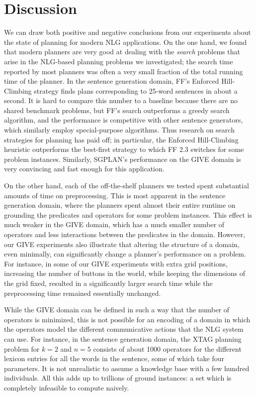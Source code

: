 \section{Discussion}
\label{sec:discussion}

We can draw both positive and negative conclusions from our experiments about
the state of planning for modern NLG applications. On the one hand, we found
that modern planners are very good at dealing with the \emph{search} problems
that arise in the NLG-based planning problems we investigated; the search
time reported by most planners was often a very small fraction of the total
running time of the planner. In the sentence generation domain, FF's Enforced
Hill-Climbing strategy finds plans corresponding to 25-word sentences in
about a second. It is hard to compare this number to a baseline because there
are no shared benchmark problems, but FF's search outperforms a greedy search
algorithm, and the performance is competitive with other sentence generators,
which similarly employ special-purpose algorithms. Thus research on search
strategies for planning has paid off; in particular, the Enforced
Hill-Climbing heuristic outperforms the best-first strategy to which FF 2.3
switches for some problem instances. Similarly, SGPLAN's performance on the
GIVE domain is very convincing and fast enough for this application.

On the other hand, each of the off-the-shelf planners we tested spent
substantial amounts of time on preprocessing. This is most apparent in the
sentence generation domain, where the planners spent almost their entire
runtime on grounding the predicates and operators for some problem instances.
This effect is much weaker in the GIVE domain, which has a much smaller
number of operators and less interactions between the predicates in the
domain. However, our GIVE experiments also illustrate that altering the
structure of a domain, even minimally, can significantly change a planner's
performance on a problem. For instance, in some of our GIVE experiments with
extra grid positions, increasing the number of buttons in the world, while
keeping the dimensions of the grid fixed, resulted in a significantly larger
search time while the preprocessing time remained essentially unchanged.

While the GIVE domain can be defined in such a way that the number of
operators is minimized, this is not possible for an encoding of a domain in
which the operators model the different communicative actions that the NLG
system can use. For instance, in the sentence generation domain, the XTAG
planning problem for $k=2$ and $n=5$ consists of about 1000 operators for the
different lexicon entries for all the words in the sentence, some of which
take four parameters. It is not unrealistic to assume a knowledge base with a
few hundred individuals. All this adds up to trillions of ground
instances: a set which is completely infeasible to compute naively.

